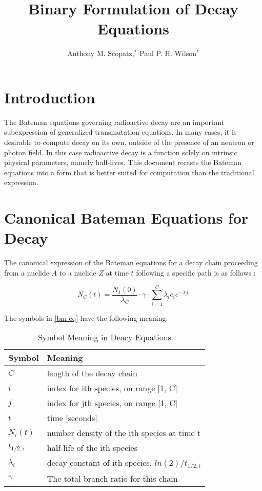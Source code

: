 \documentclass{anstrans}
\title{Binary Formulation of Decay Equations}
\author{Anthony M. Scopatz,$^{*}$ Paul P. H. Wilson$^{*}$}
\institute{
$^{*}$The University of Wisconsin-Madison, 1500 Engineering Drive, Madison,
WI
}
\begin{document}
\section{Introduction}

The Bateman equations governing radioactive decay are an important 
subexpression of generalized transmutation equations. In many cases, it is 
desirable to compute decay on its own, outside of the presence of an neutron 
or photon field.  In this case radioactive decay is a function solely on 
intrinsic physical parameters, namely half-lives. This document recasts the 
Bateman equations into a form that is better suited for computation than the 
traditional expression.

\section{Canonical Bateman Equations for Decay}
The canonical expression of the Bateman equations for a decay chain 
proceeding from a nuclide $A$ to a nuclide $Z$ at time 
$t$ following a specific path is as follows \cite{Cetnar2006640}:

\begin{equation}
\label{bm-eq}
N_C(t) = \frac{N_1(0)}{\lambda_C} \cdot \gamma \cdot \sum_{i=1}^C \lambda_i c_{i} e^{-\lambda_i t}
\end{equation}

The symbols in \ref{bm-eq} have the following meaning:

\begin{table}[hbt]
\caption{Symbol Meaning in Deacy Equations}
\begin{tabular}{|l|l|}
\hline
\textbf{Symbol} & \textbf{Meaning} \\
\hline
$C$         & length of the decay chain\\
$i$         & index for ith species, on range [1, C]\\
$j$         & index for jth species, on range [1, C]\\
$t$         & time [seconds]\\
$N_i(t)$    & number density of the ith species at time t\\
$t_{1/2,i}$ & half-life of the ith species\\
$\lambda_i$ & decay constant of ith species, $ln(2)/t_{1/2,i}$\\
$\gamma$    & The total branch ratio for this chain\\
\hline
\end{tabular}
\end{table}
\end{document}

